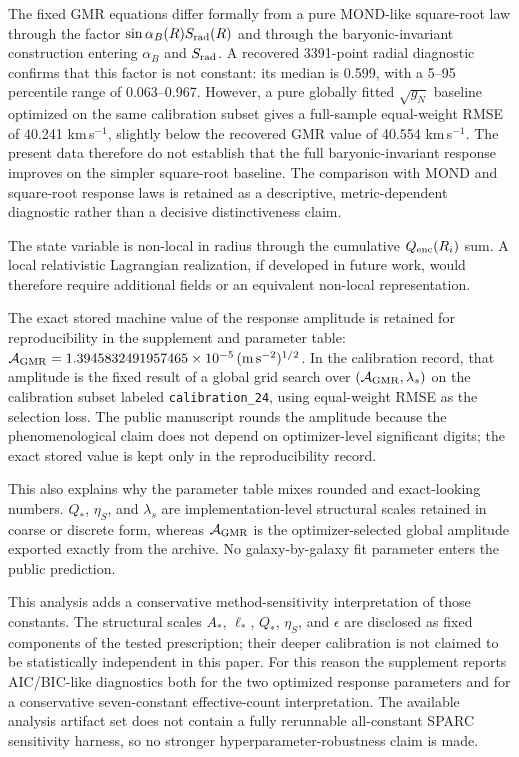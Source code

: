 ﻿\documentclass[twocolumn,linenumbers]{aastex701}
\begin{document}
The fixed GMR equations differ formally from a pure MOND-like square-root law through the factor $\sin\alpha_B(R)S_{\rm rad}(R)$ and through the baryonic-invariant construction entering $\alpha_B$ and $S_{\rm rad}$. A recovered 3391-point radial diagnostic confirms that this factor is not constant: its median is 0.599, with a 5--95 percentile range of 0.063--0.967. However, a pure globally fitted $\sqrt{g_N}$ baseline optimized on the same calibration subset gives a full-sample equal-weight RMSE of 40.241 km\,s$^{-1}$, slightly below the recovered GMR value of 40.554 km\,s$^{-1}$. The present data therefore do not establish that the full baryonic-invariant response improves on the simpler square-root baseline. The comparison with MOND and square-root response laws is retained as a descriptive, metric-dependent diagnostic rather than a decisive distinctiveness claim.

The state variable is non-local in radius through the cumulative $Q_{\rm enc}(R_i)$ sum. A local relativistic Lagrangian realization, if developed in future work, would therefore require additional fields or an equivalent non-local representation.


The exact stored machine value of the response amplitude is retained for reproducibility in the supplement and parameter table: $\mathcal{A}_{\rm GMR} = 1.3945832491957465\times10^{-5}\,(\mathrm{m\,s^{-2}})^{1/2}$. In the calibration record, that amplitude is the fixed result of a global grid search over $(\mathcal{A}_{\rm GMR}, \lambda_s)$ on the calibration subset labeled \texttt{calibration\_24}, using equal-weight RMSE as the selection loss. The public manuscript rounds the amplitude because the phenomenological claim does not depend on optimizer-level significant digits; the exact stored value is kept only in the reproducibility record.

This also explains why the parameter table mixes rounded and exact-looking numbers. $Q_*$, $\eta_S$, and $\lambda_s$ are implementation-level structural scales retained in coarse or discrete form, whereas $\mathcal{A}_{\rm GMR}$ is the optimizer-selected global amplitude exported exactly from the archive. No galaxy-by-galaxy fit parameter enters the public prediction.

This analysis adds a conservative method-sensitivity interpretation of those constants. The structural scales $A_*$, $\ell_*$, $Q_*$, $\eta_S$, and $\epsilon$ are disclosed as fixed components of the tested prescription; their deeper calibration is not claimed to be statistically independent in this paper. For this reason the supplement reports AIC/BIC-like diagnostics both for the two optimized response parameters and for a conservative seven-constant effective-count interpretation. The available analysis artifact set does not contain a fully rerunnable all-constant SPARC sensitivity harness, so no stronger hyperparameter-robustness claim is made.
\end{document}
